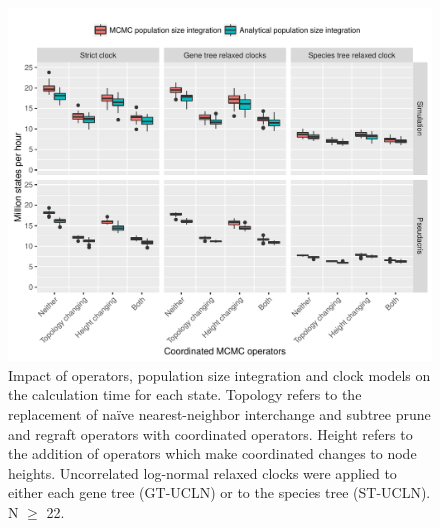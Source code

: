 \documentclass[12pt]{article}
\begin{document}
\clearpage

\begin{figure}[htb!]
\centering
\includegraphics[width=\textwidth]{mstates_per_hour.pdf}
\caption
{Impact of operators, population size integration and clock models on
the calculation time for each state. Topology refers to the
replacement of na\"ive nearest-neighbor interchange and subtree prune and
regraft operators with coordinated operators. Height refers to the addition of
operators which make coordinated changes to node heights. Uncorrelated
log-normal relaxed clocks were applied to either each gene tree (GT-UCLN) or to
the species tree (ST-UCLN). N $\ge$ 22.}
\label{fig:mstatesPerHour}
\end{figure}

\clearpage

\end{document}
